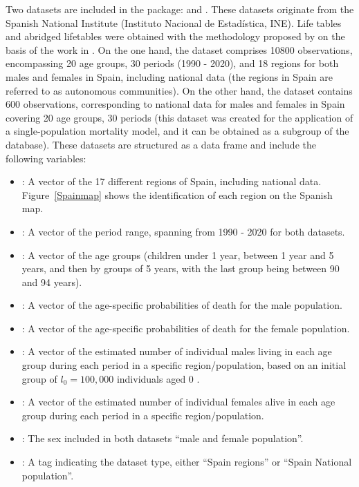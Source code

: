 Two datasets are included in the package:  and . These datasets originate from the Spanish National Institute (Instituto Nacional de Estadística, INE). Life tables and abridged lifetables were obtained with the methodology proposed by \citet{ine10b} on the basis of the work in \citet{Elandt-Johnson80}. On the one hand, the  dataset comprises 10800 observations, encompassing 20 age groups, 30 periods (1990 - 2020), and 18 regions for both males and females in Spain, including national data (the regions in Spain are referred to as autonomous communities). On the other hand, the  dataset contains 600 observations, corresponding to national data for males and females in Spain covering 20 age groups, 30 periods (this dataset was created for the application of a single-population mortality model, and it can be obtained as a subgroup of the  database). These datasets are structured as a data frame and include the following variables:
\begin{itemize}
\item {}: A vector of the 17 different regions of Spain, including national data. Figure~\ref{Spainmap} shows the identification of each region on the Spanish map.
\item {}: A vector of the period range, spanning from 1990 - 2020 for both datasets.
\item {}: A vector of the age groups (children under 1 year, between 1 year and 5 years, and then by groups of 5 years, with the last group being between 90 and 94 years).
\item {}: A vector of the age-specific probabilities of death for the male population.
\item {}: A vector of the age-specific probabilities of death for the female population.
\item {}: A vector of the estimated number of individual males living in each age group during each period in a specific region/population, based on an initial group of $l_{0}=100,000$ individuals aged 0 \citep{Pitacco2009}.
\item {}: A vector of the estimated number of individual females alive in each age group during each period in a specific region/population.
\item {}: The sex included in both datasets ``male and female population''.
\item {}: A tag indicating the dataset type, either ``Spain regions'' or ``Spain National population''.
\end{itemize}

